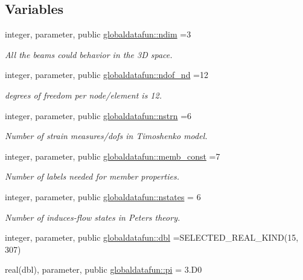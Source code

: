 \subsection*{Variables}
\begin{DoxyCompactItemize}
\item 
integer, parameter, public \hyperlink{namespaceglobaldatafun_a5041a6e08575b124a458c49a76dc6d31}{globaldatafun\+::ndim} =3
\begin{DoxyCompactList}\small\item\em All the beams could behavior in the 3D space. \end{DoxyCompactList}\item 
integer, parameter, public \hyperlink{namespaceglobaldatafun_a44ab75808fb35a144d54fa9a6c9fe07a}{globaldatafun\+::ndof\+\_\+nd} =12
\begin{DoxyCompactList}\small\item\em degrees of freedom per node/element is 12. \end{DoxyCompactList}\item 
integer, parameter, public \hyperlink{namespaceglobaldatafun_a3aff613607f0e62fc5c5739e9f2432e9}{globaldatafun\+::nstrn} =6
\begin{DoxyCompactList}\small\item\em Number of strain measures/dofs in Timoshenko model. \end{DoxyCompactList}\item 
integer, parameter, public \hyperlink{namespaceglobaldatafun_ae88f4c5de30b425e43d5392116dfdcda}{globaldatafun\+::memb\+\_\+const} =7
\begin{DoxyCompactList}\small\item\em Number of labels needed for member properties. \end{DoxyCompactList}\item 
integer, parameter, public \hyperlink{namespaceglobaldatafun_a2c33dd8d5d818282893dd132f6b33564}{globaldatafun\+::nstates} = 6
\begin{DoxyCompactList}\small\item\em Number of induces-\/flow states in Peters theory. \end{DoxyCompactList}\item 
integer, parameter, public \hyperlink{namespaceglobaldatafun_a5008801201dd34f2af8eae07756befb4}{globaldatafun\+::dbl} =S\+E\+L\+E\+C\+T\+E\+D\+\_\+\+R\+E\+A\+L\+\_\+\+K\+I\+ND(15, 307)
\item 
real(dbl), parameter, public \hyperlink{namespaceglobaldatafun_a05144a47841796a672385a1db57f91a1}{globaldatafun\+::pi} = 3.\+D0

\end{DoxyCompactItemize}
